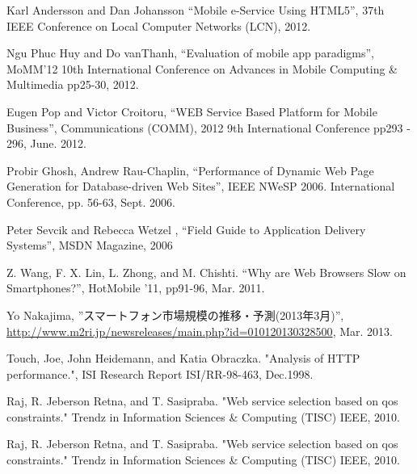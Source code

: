 \documentclass[twocolumn]{jsarticle}
\begin{document}
\begin{thebibliography}{99}
\begin{spacing}{0.7}
\scriptsize{
\item Karl Andersson and Dan Johansson ``Mobile e-Service Using HTML5'', 37th
IEEE Conference on Local Computer Networks (LCN), 2012.
\label{bib:Karl}

\item Ngu Phuc Huy and Do vanThanh, ``Evaluation of mobile app paradigms'',
MoMM'12 10th International Conference on Advances in Mobile Computing \&
Multimedia pp25-30, 2012.
\label{bib:Ngu}

\item Eugen Pop and Victor Croitoru, ``WEB Service Based Platform for Mobile
Business'', Communications (COMM), 2012 9th International Conference pp293 -
296, June. 2012.
\label{bib:Eugen}

\item Probir Ghosh, Andrew Rau-Chaplin, ``Performance of Dynamic Web Page
Generation for Database-driven Web Sites'', IEEE NWeSP 2006. International
Conference, pp. 56-63, Sept. 2006.
\label{bib:Ghosh}

\item Peter Sevcik and Rebecca Wetzel , “Field Guide to Application Delivery Systems”, MSDN Magazine, 2006
\label{bib:Peter}

\item Z. Wang, F. X. Lin, L. Zhong, and M. Chishti. ``Why are Web Browsers Slow
on Smartphones?'', HotMobile '11, pp91-96, Mar. 2011.
\label{bib:Wang}

\item Yo Nakajima, ''スマートフォン市場規模の推移・予測(2013年3月)'',
\url{http://www.m2ri.jp/newsreleases/main.php?id=010120130328500}, Mar. 2013.
\label{bib:Nakajima}

\item Touch, Joe, John Heidemann, and Katia Obraczka. "Analysis of HTTP
performance.", ISI Research Report ISI/RR-98-463, Dec.1998.
\label{bib:Touch}

\item Raj, R. Jeberson Retna, and T. Sasipraba. "Web service selection based on
qos constraints." Trendz in Information Sciences \& Computing (TISC) IEEE, 2010.
\label{bib:Raj}

\item Raj, R. Jeberson Retna, and T. Sasipraba. "Web service selection based on
qos constraints." Trendz in Information Sciences \& Computing (TISC) IEEE, 2010.
\label{bib:Raj}

}
\end{spacing}
\end{thebibliography}
\end{document}
